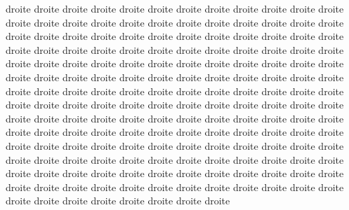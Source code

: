 \documentclass[openany]{book}
\begin{document}
\begin{pages}
\begin{Rightside}
\pstart
droite droite droite droite droite droite droite droite droite droite
droite droite droite droite droite droite droite droite droite droite
droite droite droite droite droite droite droite droite droite droite
droite droite droite droite droite droite droite droite droite droite
droite droite droite droite droite droite droite droite droite droite
droite droite droite droite droite droite droite droite droite droite
droite droite droite droite droite droite droite droite droite droite
droite droite droite droite droite droite droite droite droite droite
droite droite droite droite droite droite droite droite droite droite
droite droite droite droite droite droite droite droite droite droite
droite droite droite droite droite droite droite droite droite droite
droite droite droite droite droite droite droite droite droite droite
droite droite droite droite droite droite droite droite droite droite
droite droite droite droite droite droite droite droite droite droite
droite droite droite droite droite droite droite droite droite droite
droite droite droite droite droite droite droite droite droite droite
droite droite droite droite droite droite droite droite droite droite
droite droite droite droite droite droite
\pend

\endnumbering  
\end{Rightside}

\end{pages}

\Pages
\end{document}
